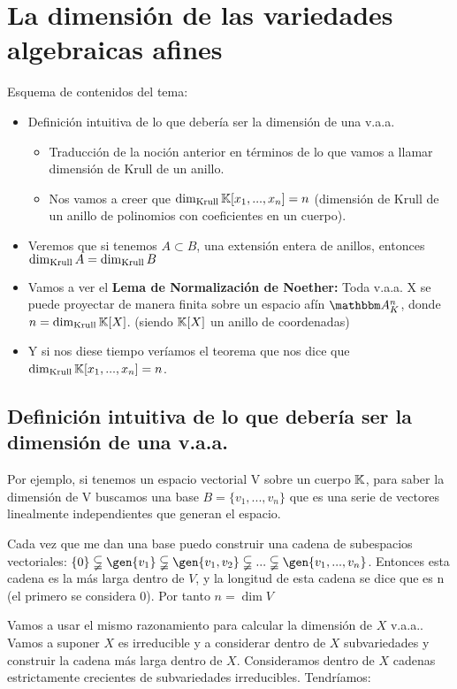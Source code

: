 
\chapter{La dimensión de las variedades algebraicas afines}

Esquema de contenidos del tema:

\begin{itemize}
	\item Definición intuitiva de lo que debería ser la dimensión de una v.a.a.
	\begin{itemize}
		\item Traducción de la noción anterior en términos de lo que vamos a llamar dimensión de Krull de un anillo.
		\item Nos vamos a creer que $\dim_{\mathrm{Krull}}\mathbb{K}[x_1,...,x_n]=n$ (dimensión de Krull de un anillo de polinomios con coeficientes en un cuerpo).
	\end{itemize}
	\item Veremos que si tenemos $A \subset B$, una extensión entera de anillos, entonces $ \dim_{\mathrm{Krull}} A = \dim_{\mathrm{Krull}} B$
	\item Vamos a ver el \textbf{Lema de Normalización de Noether:} Toda v.a.a. X se puede proyectar de manera finita sobre un espacio afín $\Akn$, donde $n=\dim_{\mathrm{Krull}}\mathbb{K}[X]$. (siendo $\mathbb{K}[X]$ un anillo de coordenadas) %
	\item Y si nos diese tiempo veríamos el teorema que nos dice que $\dim_{\mathrm{Krull}}\mathbb{K}[x_1,...,x_n]=n$.
\end{itemize}

\section{Definición intuitiva de lo que debería ser la dimensión de una v.a.a.}

Por ejemplo, si tenemos un espacio vectorial V sobre un cuerpo $\mathbb{K}$, para saber la dimensión de V buscamos una base $B=\{ v_1,...,v_n\}$ que es una serie de vectores linealmente independientes que generan el espacio.

Cada vez que me dan una base puedo construir una cadena de subespacios vectoriales:
$\{0\} \subsetneqq \gen{v_1} \subsetneqq \gen{v_1,v_2} \subsetneqq ... \subsetneqq \gen{v_1,...,v_n}$. Entonces esta cadena es la más larga dentro de $V$, y la longitud de esta cadena se dice que es n (el primero se considera 0). Por tanto $n= \dim V$

Vamos a usar el mismo razonamiento para calcular la dimensión de $X$ v.a.a.. Vamos a suponer $X$ es irreducible y a considerar dentro de $X$ subvariedades y construir la cadena más larga dentro de $X$. Consideramos dentro de $X$ cadenas estrictamente crecientes de subvariedades irreducibles. Tendríamos:

